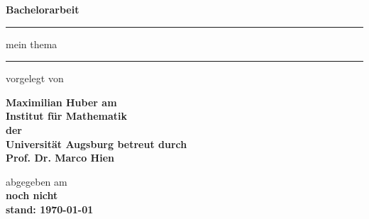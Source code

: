 \begin{titlepage}
  \thispagestyle{empty}
  \newcommand{\Rule}{\rule{\textwidth}{1mm}}
  \begin{center}\sffamily\bfseries
    \LARGE Bachelorarbeit
    \vfill
    \Rule\vspace{5mm}
    \Huge
    mein thema
    \vspace{1mm}\Rule
    \vfill
    \normalfont\sffamily\large vorgelegt von\par
    \bfseries\LARGE Maximilian Huber
    \vfill
    \normalfont\sffamily\large am\\
    \bfseries\Large Institut für Mathematik\\
    \normalfont\sffamily\large der\\
    \bfseries\Large Universität Augsburg
    \vfill
    \normalfont\sffamily\large betreut durch \\
    \bfseries\Large Prof. Dr. Marco Hien \par
    \vfill
    \normalfont\sffamily\large abgegeben am \\
    \bfseries\Large noch nicht\\
    stand: \today
  \end{center}
\end{titlepage}
